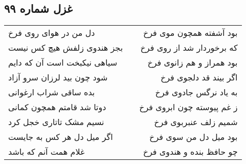 \begin{center}
\section*{غزل شماره ۹۹}
\label{sec:sh099}
\begin{longtable}{l p{0.5cm} r}
دل من در هوای روی فرخ
&&
بود آشفته همچون موی فرخ
\\
بجز هندوی زلفش هیچ کس نیست
&&
که برخوردار شد از روی فرخ
\\
سیاهی نیکبخت است آن که دایم
&&
بود همراز و هم زانوی فرخ
\\
شود چون بید لرزان سرو آزاد
&&
اگر بیند قد دلجوی فرخ
\\
بده ساقی شراب ارغوانی
&&
به یاد نرگس جادوی فرخ
\\
دوتا شد قامتم همچون کمانی
&&
ز غم پیوسته چون ابروی فرخ
\\
نسیم مشک تاتاری خجل کرد
&&
شمیم زلف عنبربوی فرخ
\\
اگر میل دل هر کس به جایست
&&
بود میل دل من سوی فرخ
\\
غلام همت آنم که باشد
&&
چو حافظ بنده و هندوی فرخ
\\
\end{longtable}
\end{center}
